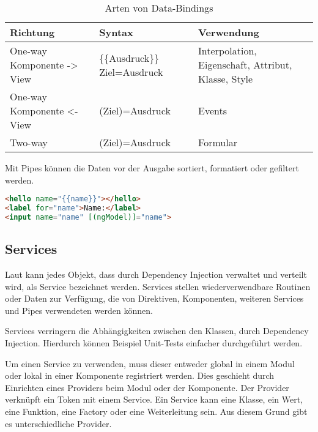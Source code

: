 \begin{table}
\begin{tabular}{|>{\raggedright\arraybackslash}p{3cm}|>{\raggedright\arraybackslash}p{3.2cm}|>{\raggedright\arraybackslash}p{7cm}|}
	\hline
	\textbf{Richtung}&\textbf{Syntax}&\textbf{Verwendung}\\
	\hline 
	One-way Komponente -> View &\{\{Ausdruck\}\} \lbrack Ziel\rbrack =\dq Ausdruck\dq  & Interpolation, Eigenschaft, Attribut, Klasse, Style\\ 
	\hline 
	One-way Komponente <- View &(Ziel)=\dq Ausdruck\dq&Events\\ 
	\hline 
	Two-way&\lbrack (Ziel)\rbrack =\dq Ausdruck\dq&Formular\\ 
	\hline 
\end{tabular}
\caption{Arten von Data-Bindings}
\label{tab:DataBinding}
\end{table}

Mit Pipes können die  Daten vor der Ausgabe sortiert, formatiert oder gefiltert werden. \autocite[vgl.][83\psqq]{Steyer.2017}

\begin{lstlisting}[caption=Das Template in der Datei app.component.html, label=lst:AppComponentHTML, language=HTML]
<hello name="{{name}}"></hello>
<label for="name">Name:</label>
<input name="name" [(ngModel)]="name">
\end{lstlisting}

\subsection{Services}
Laut \textcite[vgl.][474]{Freeman.2018} kann jedes Objekt, dass durch Dependency Injection verwaltet und verteilt wird, als Service bezeichnet werden. Services stellen wiederverwendbare Routinen oder Daten zur Verfügung, die von Direktiven, Komponenten, weiteren Services und Pipes verwendeten werden können. \autocites[vgl.][467\psqq]{Freeman.2018}[vgl.][89]{Steyer.2017}

Services verringern die Abhängigkeiten zwischen den Klassen, durch Dependency Injection. Hierdurch können Beispiel Unit-Tests einfacher durchgeführt werden. \autocite[vgl.][469]{Freeman.2018} 

Um einen Service zu verwenden, muss dieser entweder global in einem Modul oder lokal in einer Komponente registriert werden. Dies geschieht durch Einrichten eines Providers beim Modul oder der Komponente. Der Provider verknüpft ein Token mit einem Service. Ein Service kann eine Klasse, ein Wert, eine Funktion, eine Factory oder eine Weiterleitung sein. Aus diesem Grund gibt es unterschiedliche Provider.

